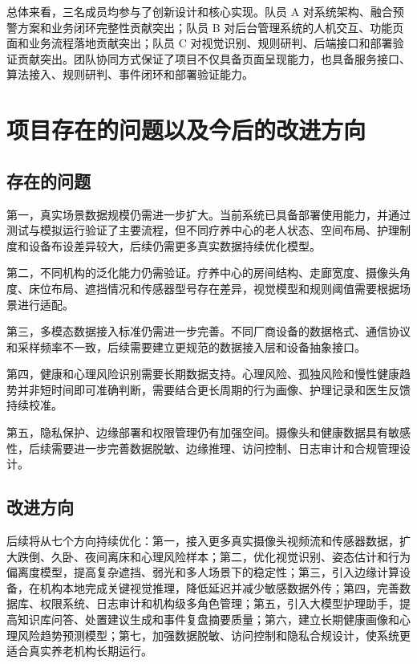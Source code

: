 \documentclass[UTF8,a4paper,zihao=-4,fontset=fandol]{ctexart}
\begin{document}
总体来看，三名成员均参与了创新设计和核心实现。队员 A 对系统架构、融合预警方案和业务闭环完整性贡献突出；队员 B 对后台管理系统的人机交互、功能页面和业务流程落地贡献突出；队员 C 对视觉识别、规则研判、后端接口和部署验证贡献突出。团队协同方式保证了项目不仅具备页面呈现能力，也具备服务接口、算法接入、规则研判、事件闭环和部署验证能力。

\section{项目存在的问题以及今后的改进方向}

\subsection{存在的问题}

第一，真实场景数据规模仍需进一步扩大。当前系统已具备部署使用能力，并通过测试与模拟运行验证了主要流程，但不同疗养中心的老人状态、空间布局、护理制度和设备布设差异较大，后续仍需更多真实数据持续优化模型。

第二，不同机构的泛化能力仍需验证。疗养中心的房间结构、走廊宽度、摄像头角度、床位布局、遮挡情况和传感器型号存在差异，视觉模型和规则阈值需要根据场景进行适配。

第三，多模态数据接入标准仍需进一步完善。不同厂商设备的数据格式、通信协议和采样频率不一致，后续需要建立更规范的数据接入层和设备抽象接口。

第四，健康和心理风险识别需要长期数据支持。心理风险、孤独风险和慢性健康趋势并非短时间即可准确判断，需要结合更长周期的行为画像、护理记录和医生反馈持续校准。

第五，隐私保护、边缘部署和权限管理仍有加强空间。摄像头和健康数据具有敏感性，后续需要进一步完善数据脱敏、边缘推理、访问控制、日志审计和合规管理设计。

\subsection{改进方向}

后续将从七个方向持续优化：第一，接入更多真实摄像头视频流和传感器数据，扩大跌倒、久卧、夜间离床和心理风险样本；第二，优化视觉识别、姿态估计和行为偏离度模型，提高复杂遮挡、弱光和多人场景下的稳定性；第三，引入边缘计算设备，在机构本地完成关键视觉推理，降低延迟并减少敏感数据外传；第四，完善数据库、权限系统、日志审计和机构级多角色管理；第五，引入大模型护理助手，提高知识库问答、处置建议生成和事件复盘摘要质量；第六，建立长期健康画像和心理风险趋势预测模型；第七，加强数据脱敏、访问控制和隐私合规设计，使系统更适合真实养老机构长期运行。
\end{document}
